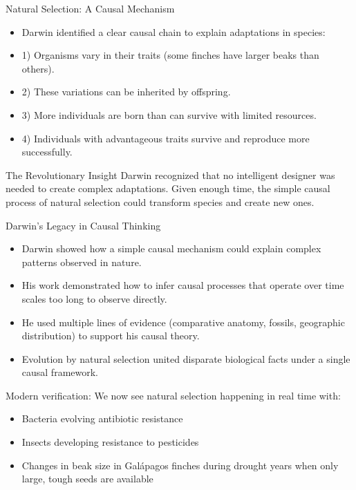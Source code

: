 \documentclass{beamer}
\begin{document}
\begin{frame}{Natural Selection: A Causal Mechanism}
    \begin{itemize}
        \item Darwin identified a clear causal chain to explain adaptations in species:
        \item 1) Organisms vary in their traits (some finches have larger beaks than others).
        \item 2) These variations can be inherited by offspring.
        \item 3) More individuals are born than can survive with limited resources.
        \item 4) Individuals with advantageous traits survive and reproduce more successfully.
    \end{itemize}
    
    \begin{alertblock}{The Revolutionary Insight}
        Darwin recognized that no intelligent designer was needed to create complex adaptations. Given enough time, the simple causal process of natural selection could transform species and create new ones.
    \end{alertblock}
\end{frame}

\begin{frame}{Darwin's Legacy in Causal Thinking}
    \begin{itemize}
        \item Darwin showed how a simple causal mechanism could explain complex patterns observed in nature.
        \item His work demonstrated how to infer causal processes that operate over time scales too long to observe directly.
        \item He used multiple lines of evidence (comparative anatomy, fossils, geographic distribution) to support his causal theory.
        \item Evolution by natural selection united disparate biological facts under a single causal framework.
    \end{itemize}
    
    \begin{example}
        Modern verification: We now see natural selection happening in real time with:
        \begin{itemize}
            \item Bacteria evolving antibiotic resistance
            \item Insects developing resistance to pesticides
            \item Changes in beak size in Galápagos finches during drought years when only large, tough seeds are available
        \end{itemize}
    \end{example}
\end{frame}
\end{document}
